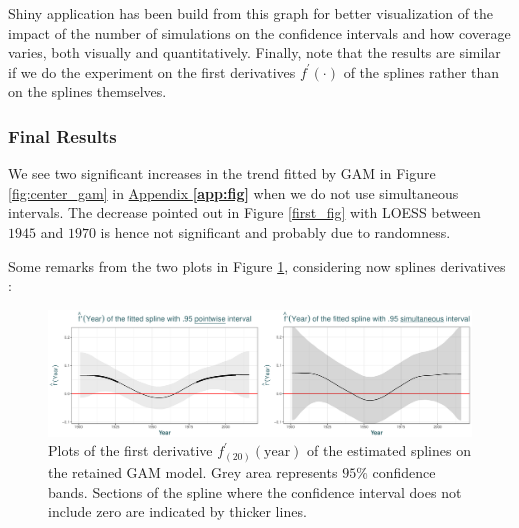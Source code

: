 Shiny application has been build from this graph for better visualization of the impact of the number of simulations on the confidence intervals and how coverage varies, both visually and quantitatively.
Finally, note that the results are similar if we do the experiment on the first derivatives $f^{'}(\cdot)$ of the splines rather than on the splines themselves.


\subsubsection*{Final Results}

We see two significant increases in the trend fitted by GAM in Figure \ref{fig:center_gam} in \hyperref[app:fig]{Appendix \textbf{\ref{app:fig}}} when we do not use  simultaneous intervals. The decrease pointed out in Figure \ref{first_fig} with LOESS between $1945$ and $1970$ is hence not significant and probably due to randomness.

Some remarks from the two plots in Figure \ref{fig:derivsplines}, considering now splines derivatives :

\begin{figure}[!htb]
	\includegraphics[width=.99\linewidth]{splines.pdf}\caption{Plots of the first derivative $f_{(20)}^{'}(\text{year})$ of the estimated splines on the retained GAM model. Grey area represents $95\%$ confidence bands. Sections of the spline where the confidence interval does not include zero are indicated by thicker lines. }\label{fig:derivsplines}
\end{figure}


